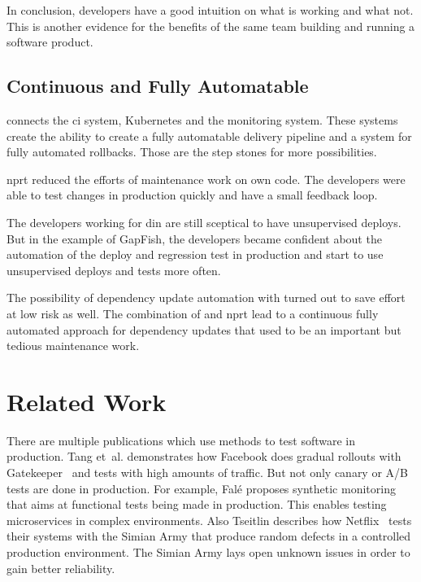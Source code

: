 In conclusion, developers have a good intuition on what is
working and what not. This is another evidence for the benefits of the same team building
and running a software product.

\subsection{Continuous and Fully Automatable}

\deployer{} connects the \gls{ci} system, Kubernetes and the monitoring system. These systems
create the ability to create a fully automatable delivery pipeline and a system for fully
automated rollbacks. Those are the step stones for more possibilities.

\gls{nprt} reduced the efforts of maintenance work on own code. The developers were able to
test changes in production quickly and have a small feedback loop.

The developers working for \gls{din} are still sceptical to have unsupervised deploys. But
in the example of GapFish, the developers became confident about the automation of the
deploy and regression test in production and start to use unsupervised deploys and tests
more often.

The possibility of dependency update automation with \gemupdater{} turned out to save effort
at low risk as well. The combination of \gemupdater{} and \gls{nprt} lead to a continuous
fully automated approach for dependency updates that used to be an important but
tedious maintenance work.

\section{Related Work}

There are multiple publications which use methods to test software in
production. Tang et~al. demonstrates how Facebook does gradual rollouts with
Gatekeeper~\cite{fb_config_management} and tests with high amounts of traffic. But not
only canary or A/B tests are done in production. For example, Falé proposes synthetic
monitoring~\cite{synthmonitoring} that aims at functional tests being made in
production. This enables testing microservices in complex environments. Also Tseitlin
describes how Netflix~\cite{antifragile_org} tests their systems with the Simian Army that
produce random defects in a controlled production environment. The Simian Army lays
open unknown issues in order to gain better reliability.


